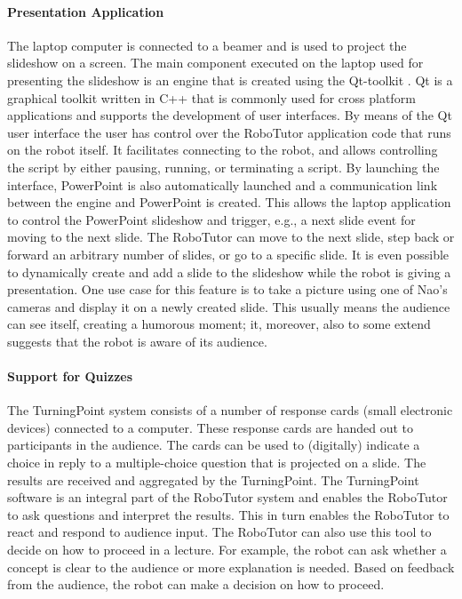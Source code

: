 \paragraph{Presentation Application}
The laptop computer is connected to a beamer and is used to project the slideshow on a screen. The main component executed on the laptop used for presenting the slideshow is an engine that is created using the Qt-toolkit \cite{QT}. Qt is a graphical toolkit written in C++ that is commonly used for cross platform applications and supports the development of user interfaces. By means of the Qt user interface the user has control over the RoboTutor application code that runs on the robot itself. It facilitates connecting to the robot, and allows controlling the script by either pausing, running, or terminating a script. By launching the interface, PowerPoint is also automatically launched and a communication link between the engine and PowerPoint is created. This allows the laptop application to control the PowerPoint slideshow and trigger, e.g., a next slide event for moving to the next slide. The RoboTutor can move to the next slide, step back or forward an arbitrary number of slides, or go to a specific slide. It is even possible to dynamically create and add a slide to the slideshow while the robot is giving a presentation. One use case for this feature is to take a picture using one of Nao's cameras and display it on a newly created slide. This usually means the audience can see itself, creating a humorous moment; it, moreover, also to some extend suggests that the robot is aware of its audience.

%
\paragraph{Support for Quizzes}
The TurningPoint system consists of a number of response cards (small electronic devices) connected to a computer. These response cards are handed out to participants in the audience. The cards can be used to (digitally) indicate a choice in reply to a multiple-choice question that is projected on a slide. The results are received and aggregated by the TurningPoint. The TurningPoint software is an integral part of the RoboTutor system and enables the RoboTutor to ask questions and interpret the results. This in turn enables the RoboTutor to react and respond to audience input. The RoboTutor can also use this tool to decide on how to proceed in a lecture. For example, the robot can ask whether a concept is clear to the audience or more explanation is needed. Based on feedback from the audience, the robot can make a decision on how to proceed.

